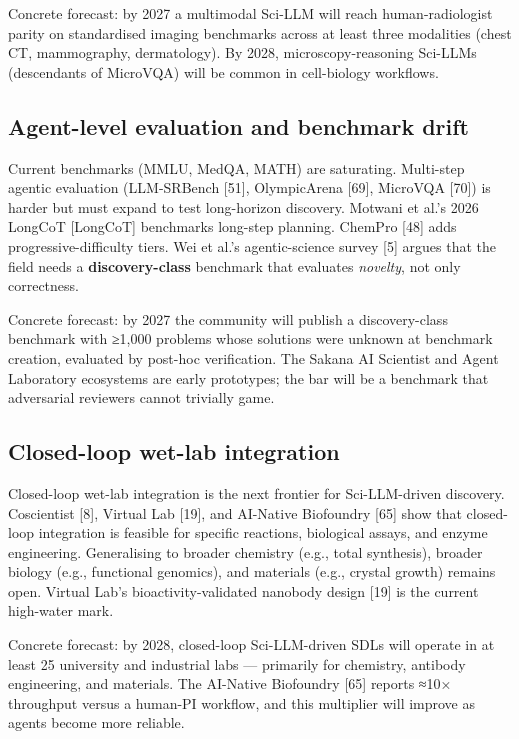 Concrete forecast: by 2027 a multimodal Sci-LLM will reach human-radiologist parity on standardised imaging benchmarks across at least three modalities (chest CT, mammography, dermatology). By 2028, microscopy-reasoning Sci-LLMs (descendants of MicroVQA) will be common in cell-biology workflows.

\subsection{Agent-level evaluation and benchmark drift}\label{agent-level-evaluation-and-benchmark-drift}

Current benchmarks (MMLU, MedQA, MATH) are saturating. Multi-step agentic evaluation (LLM-SRBench {[}51{]}, OlympicArena {[}69{]}, MicroVQA {[}70{]}) is harder but must expand to test long-horizon discovery. Motwani et al.'s 2026 LongCoT {[}LongCoT{]} benchmarks long-step planning. ChemPro {[}48{]} adds progressive-difficulty tiers. Wei et al.'s agentic-science survey {[}5{]} argues that the field needs a \textbf{discovery-class} benchmark that evaluates \emph{novelty}, not only correctness.

Concrete forecast: by 2027 the community will publish a discovery-class benchmark with ≥1,000 problems whose solutions were unknown at benchmark creation, evaluated by post-hoc verification. The Sakana AI Scientist and Agent Laboratory ecosystems are early prototypes; the bar will be a benchmark that adversarial reviewers cannot trivially game.

\subsection{Closed-loop wet-lab integration}\label{closed-loop-wet-lab-integration}

Closed-loop wet-lab integration is the next frontier for Sci-LLM-driven discovery. Coscientist {[}8{]}, Virtual Lab {[}19{]}, and AI-Native Biofoundry {[}65{]} show that closed-loop integration is feasible for specific reactions, biological assays, and enzyme engineering. Generalising to broader chemistry (e.g., total synthesis), broader biology (e.g., functional genomics), and materials (e.g., crystal growth) remains open. Virtual Lab's bioactivity-validated nanobody design {[}19{]} is the current high-water mark.

Concrete forecast: by 2028, closed-loop Sci-LLM-driven SDLs will operate in at least 25 university and industrial labs --- primarily for chemistry, antibody engineering, and materials. The AI-Native Biofoundry {[}65{]} reports ≈10× throughput versus a human-PI workflow, and this multiplier will improve as agents become more reliable.

